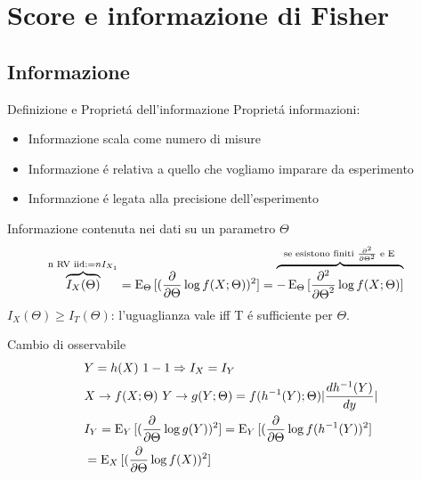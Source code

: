\documentclass[asd-beamer.tex]{subfiles}%
\begin{document}
\section{Score e informazione di Fisher}

\subsection{Informazione}

\begin{frame}{Definizione e Propriet\'a dell'informazione}
Propriet\'a informazioni:
\begin{itemize}
        \item Informazione scala come numero di misure
        \item Informazione \'e relativa a quello che vogliamo imparare da esperimento
        \item Informazione \'e legata alla precisione dell'esperimento
\end{itemize}
Informazione contenuta nei dati su un parametro $\Theta$
\begin{align*}
&\overbrace{I_X(\Theta)}^{\text{n RV iid:}=nI_{X_1}}=\E_{\Theta}{[(\PDof{\Theta}\log{f(X;\Theta}))^2]}=\overbrace{-\E_{\Theta}{[\PtwoDof{\Theta}\log{f(X;\Theta)}]}}^{\text{se esistono finiti $\PtwoDof{\Theta}$ e $\E{}$}}
\end{align*}
$I_X(\Theta)\geq I_T(\Theta)$: l'uguaglianza vale iff T \'e sufficiente per $\Theta$.
\begin{block}{Cambio di osservabile}
\begin{align*} 
&Y=h(X)\ 1-1 \Rightarrow I_X=I_Y\\
&X\to f(X;\Theta)\ Y\to g(Y;\Theta)=f(\invers{h}(Y);\Theta)|\TDy{y}{\invers{h}(Y)}|\\
&I_Y=\E_Y{[(\PDof{\Theta}\log{g(Y)})^2]}=\E_Y{[(\PDof{\Theta}\log{f(\invers{h}(Y)})^2]}\\
&=\E_X{[(\PDof{\Theta}\log{f(X)})^2]}
\end{align*}
\end{block}
\end{frame}
\end{document}
